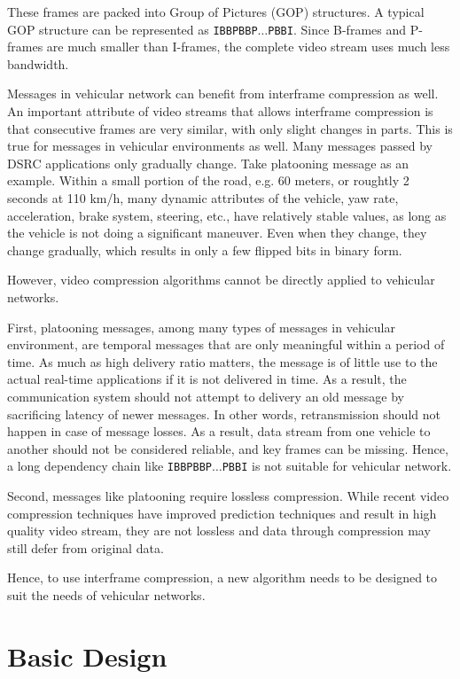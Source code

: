 \documentclass[12pt]{report}
\begin{document}
These frames are packed into Group of Pictures (GOP) structures. A typical GOP structure can be represented as \texttt{IBBPBBP$\ldots$PBBI}. Since B-frames and P-frames are much smaller than I-frames, the complete video stream uses much less bandwidth.

Messages in vehicular network can benefit from interframe compression as well. An important attribute of video streams that allows interframe compression is that consecutive frames are very similar, with only slight changes in parts. This is true for messages in vehicular environments as well. Many messages passed by DSRC applications only gradually change. Take platooning message as an example. Within a small portion of the road, e.g. 60 meters, or roughtly 2 seconds at 110 km/h, many dynamic attributes of the vehicle, yaw rate, acceleration, brake system, steering, etc., have relatively stable values, as long as the vehicle is not doing a significant maneuver. Even when they change, they change gradually, which results in only a few flipped bits in binary form.

However, video compression algorithms cannot be directly applied to vehicular networks.

First, platooning messages, among many types of messages in vehicular environment, are temporal messages that are only meaningful within a period of time. As much as high delivery ratio matters, the message is of little use to the actual real-time applications if it is not delivered in time. As a result, the communication system should not attempt to delivery an old message by sacrificing latency of newer messages. In other words, retransmission should not happen in case of message losses. As a result, data stream from one vehicle to another should not be considered reliable, and key frames can be missing. Hence, a long dependency chain like \texttt{IBBPBBP$\ldots$PBBI} is not suitable for vehicular network.

Second, messages like platooning require lossless compression. While recent video compression techniques have improved prediction techniques and result in high quality video stream, they are not lossless and data through compression may still defer from original data.

Hence, to use interframe compression, a new algorithm needs to be designed to suit the needs of vehicular networks.

\section{Basic Design}
\end{document}
